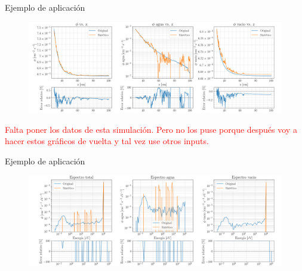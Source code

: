 \documentclass[aspectratio=169,english]{beamer}
\begin{document}
\begin{frame}{Ejemplo de aplicación}
    \begin{figure}
        \centering
        \includegraphics[width=1\linewidth]{imagens/resultados_flujo.png}
        \label{fig:flujos.png}
    \end{figure}
    \textcolor{red}{Falta poner los datos de esta simulación. Pero no los puse porque después voy a hacer estos gráficos de vuelta y tal vez use otros inputs.}
    

\end{frame}

\begin{frame}{Ejemplo de aplicación}
    
    \begin{figure}
        \centering
        \includegraphics[width=1\linewidth]{imagens/resultados_espectro.png}
        \label{fig:espectros.png}
    \end{figure}

\end{frame}

\end{document}
